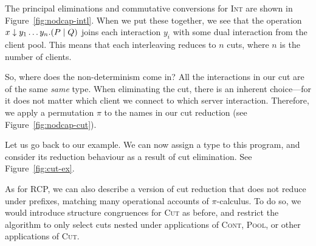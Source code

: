 \documentclass[a4paper,UKenglish]{lipics-v2016}
\begin{document}
The principal eliminations and commutative conversions for \textsc{Int} are
shown in Figure~\ref{fig:nodcap-intl}. When we put these together, we see that
the operation ${x \downarrow y_1 \dots y_n.}(P \mid Q)$ joins each interaction $y_i$
with some dual interaction from the client pool. This means that each
interleaving reduces to $n$ cuts, where $n$ is the number of clients.
%


So, where does the non-determinism come in? All the interactions in our cut are
of the same \emph{same} type. When eliminating the cut, there is an inherent
choice---for it does not matter which client we connect to which server
interaction. Therefore, we apply a permutation $\pi$ to the names in our cut
reduction (see Figure~\ref{fig:nodcap-cut}).

Let us go back to our example. We can now assign a type to this program, and
consider its reduction behaviour as a result of cut elimination. See
Figure~\ref{fig:cut-ex}.
%


As for RCP, we can also describe a version of cut reduction that does not reduce
under prefixes, matching many operational accounts of $\pi$-calculus.  To do so,
we would introduce structure congruences for \textsc{Cut} as before, and
restrict the algorithm to only select cuts nested under applications of
\textsc{Cont}, \textsc{Pool}, or other applications of \textsc{Cut}.
\end{document}
